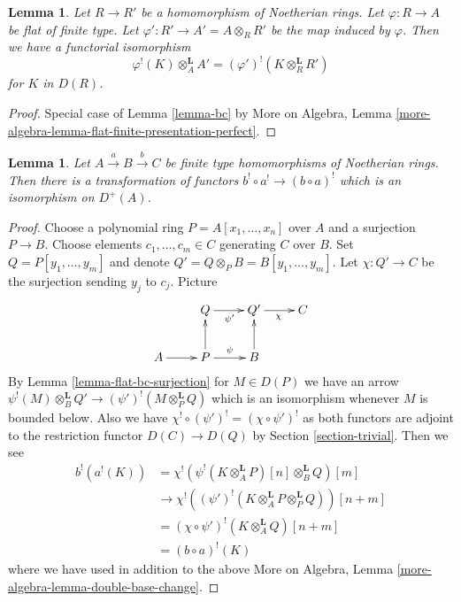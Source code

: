 \documentclass{stacks-project}
\theoremstyle{plain}
\newtheorem{lemma}[subsection]{Lemma}
\theoremstyle{definition}
\theoremstyle{remark}
\numberwithin{equation}{subsection}
\begin{document}
\begin{lemma}
\label{lemma-bc-flat}
Let $R \to R'$ be a homomorphism of Noetherian rings.
Let $\varphi : R \to A$ be flat of finite type.
Let $\varphi' : R' \to A' = A \otimes_R R'$ be the map induced by $\varphi$.
Then we have a functorial isomorphism
$$
\varphi^!(K) \otimes_A^\mathbf{L} A' =
(\varphi')^!(K \otimes_R^\mathbf{L} R')
$$
for $K$ in $D(R)$.
\end{lemma}

\begin{proof}
Special case of Lemma \ref{lemma-bc} by
More on Algebra, Lemma
\ref{more-algebra-lemma-flat-finite-presentation-perfect}.
\end{proof}

\begin{lemma}
\label{lemma-composition-shriek-algebraic}
Let $A \xrightarrow{a} B \xrightarrow{b} C$ be finite type homomorphisms of
Noetherian rings. Then there is a transformation of functors
$b^! \circ a^! \to (b \circ a)^!$ which is an isomorphism on $D^+(A)$.
\end{lemma}

\begin{proof}
Choose a polynomial ring $P = A[x_1, \ldots, x_n]$ over $A$
and a surjection $P \to B$. Choose elements $c_1, \ldots, c_m \in C$
generating $C$ over $B$. Set $Q = P[y_1, \ldots, y_m]$ and
denote $Q' = Q \otimes_P B = B[y_1, \ldots, y_m]$.
Let $\chi : Q' \to C$ be the surjection sending $y_j$ to $c_j$.
Picture
$$
\xymatrix{
& Q \ar[r]_{\psi'} & Q' \ar[r]_\chi & C \\
A \ar[r] & P \ar[r]^\psi \ar[u] & B \ar[u]
}
$$
By Lemma \ref{lemma-flat-bc-surjection} for $M \in D(P)$ we have an arrow
$\psi^!(M) \otimes_B^\mathbf{L} Q' \to (\psi')^!(M \otimes_P^\mathbf{L} Q)$
which is an isomorphism whenever $M$ is bounded below. Also
we have $\chi^! \circ (\psi')^! = (\chi \circ \psi')^!$ as both
functors are adjoint to the restriction functor $D(C) \to D(Q)$
by Section \ref{section-trivial}. Then we see
\begin{align*}
b^!(a^!(K))
& =
\chi^!(\psi^!(K \otimes_A^\mathbf{L} P)[n] \otimes_B^\mathbf{L} Q)[m] \\
& \to
\chi^!((\psi')^!(K \otimes_A^\mathbf{L} P \otimes_P^\mathbf{L} Q))[n + m] \\
& =
(\chi \circ \psi')^!(K\otimes_A^\mathbf{L} Q)[n + m] \\
& =
(b \circ a)^!(K)
\end{align*}
where we have used in addition to the above
More on Algebra, Lemma \ref{more-algebra-lemma-double-base-change}.
\end{proof}
\end{document}
